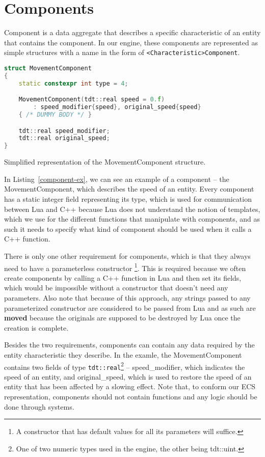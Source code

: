 \section{Components}

Component is a data aggregate that describes a specific characteristic of an entity that contains the component. In our engine, these
components are represented as simple structures with a name in the form of \texttt{<Characteristic>Component}. 

\begin{listing}
    \centering
    \begin{lstlisting}[language=C++]
struct MovementComponent
{
    static constexpr int type = 4;

    MovementComponent(tdt::real speed = 0.f)
        : speed_modifier{speed}, original_speed{speed}
    { /* DUMMY BODY */ }

    tdt::real speed_modifier;
    tdt::real original_speed;
}
    \end{lstlisting}
    \caption{Simplified representation of the MovementComponent structure.}
    \label{component-ex}
\end{listing}

In Listing~\ref{component-ex}, we can see an example of a component -- the MovementComponent, which describes the speed of an entity.
Every component has a static integer field representing its type, which is used for communication between Lua and C++ because Lua does not
understand the notion of templates, which we use for the different functions that manipulate with components, and as such it needs
to specify what kind of component should be used when it calls a C++ function.

There is only one other requirement for components, which is that they always need to have a parameterless constructor
\footnote{A constructor that has default values for all its parameters will suffice.}. This is required because
we often create components by calling a C++ function in Lua and then set its fields, which would be impossible without a constructor that
doesn't need any parameters. Also note that because of this approach, any strings passed to any parameterized constructor are considered
to be passed from Lua and as such are \textbf{moved} because the originals are supposed to be destroyed by Lua once the creation is complete.

Besides the two requirements, components can contain any data required by the entity characteristic they describe. In the examle, the
MovementComponent contains two fields of type \texttt{tdt::real}\footnote{One of two numeric types used in the engine, the other being
tdt::uint.}
-- speed\_modifier, which indicates the speed of an entity, and original\_speed, which is used
to restore the speed of an entity that has been affected by a slowing effect. Note that, to conform our
ECS representation, components should not contain functions and any logic should be done through systems.

